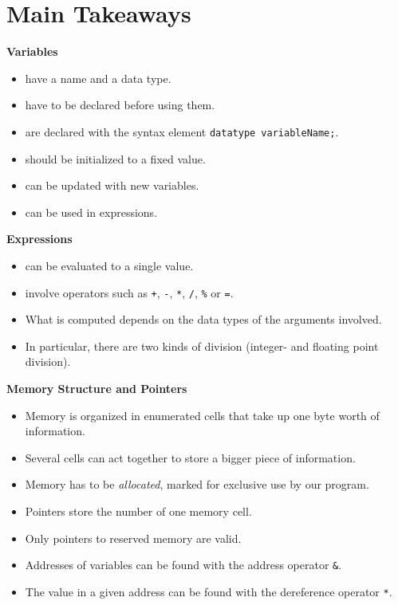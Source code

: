 {{{{\section{Main Takeaways}
\begin{defbox}
\textbf{Variables}
\begin{itemize}
\item have a name and a data type.
\item have to be declared before using them.
\item are declared with the syntax element \texttt{datatype variableName;}.
\item should be initialized to a fixed value.
\item can be updated with new variables.
\item can be used in expressions.
\end{itemize}
\end{defbox}
%
\begin{defbox}[]
\textbf{Expressions}
\begin{itemize}
\item can be evaluated to a single value.
\item involve operators such as \texttt{+}, \texttt{-}, \texttt{*}, \texttt{/}, \texttt{\%} or \texttt{=}.
\item What is computed depends on the data types of the arguments involved.
\item In particular, there are two kinds of division (integer- and floating point division).
\end{itemize}

\textbf{Memory Structure and Pointers}
\begin{itemize}
\item Memory is organized in enumerated cells that take up one byte worth of information.
\item Several cells can act together to store a bigger piece of information.
\item Memory has to be \emph{allocated}, \ie marked for exclusive use by our program.
\item Pointers store the number of one memory cell.
\item Only pointers to reserved memory are valid.
\item Addresses of variables can be found with the address operator \texttt{\&}.
\item The value in a given address can be found with the dereference operator \texttt{*}.
\end{itemize}
\end{defbox}


}}}}
